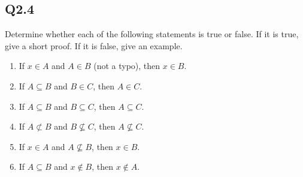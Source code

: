 \documentclass{article}
\begin{document}
\subsection*{Q2.4}
Determine whether each of the following statements is true or false. If it is true, give a short proof. If it is false, give an example.
\begin{enumerate}[label=\alph*.]
    \item If \( x \in A \) and \( A \in B \) (not a typo), then \( x \in B \).
    \item If \( A \subseteq B \) and \( B \in C \), then \( A \in C \).
    \item If \( A \subseteq B \) and \( B \subseteq C \), then \( A \subseteq C \).
    \item If \( A \not\subset B \) and \( B \not\subseteq C \), then \( A \not\subseteq C \).
    \item If \( x \in A \) and \( A \not\subseteq B \), then \( x \in B \).
    \item If \( A \subseteq B \) and \( x \notin B \), then \( x \notin A \).
\end{enumerate}
\newpage
\end{document}
